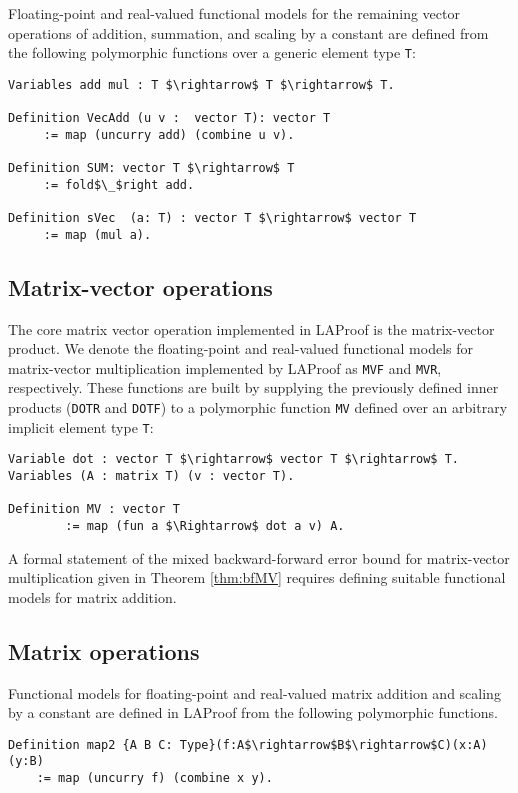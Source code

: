 Floating-point and real-valued functional models for the remaining vector operations of addition,  summation,  and scaling by a constant are defined from the following polymorphic functions over a generic element type \lstinline{T}:
%
\begin{lstlisting}
Variables add mul : T $\rightarrow$ T $\rightarrow$ T. 

Definition VecAdd (u v :  vector T): vector T
     := map (uncurry add) (combine u v).

Definition SUM: vector T $\rightarrow$ T
     := fold$\_$right add. 
  
Definition sVec  (a: T) : vector T $\rightarrow$ vector T
     := map (mul a).
 \end{lstlisting} \vspace{-1em}
%

\subsection{Matrix-vector operations}
The core matrix vector operation implemented in LAProof is the matrix-vector product. We denote the floating-point and real-valued functional models for matrix-vector  multiplication implemented by LAProof as  \lstinline{MVF} and  \lstinline{MVR}, respectively. These functions are built by supplying the previously defined inner products (\lstinline{DOTR} and \lstinline{DOTF}) to a polymorphic function \lstinline{MV} defined over an arbitrary implicit element type \lstinline{T}:
\begin{lstlisting}
Variable dot : vector T $\rightarrow$ vector T $\rightarrow$ T. 
Variables (A : matrix T) (v : vector T).

Definition MV : vector T
        := map (fun a $\Rightarrow$ dot a v) A.
 \end{lstlisting}

A formal statement of the mixed backward-forward error bound for matrix-vector multiplication given in Theorem \ref{thm:bfMV} requires defining suitable functional models for matrix addition. 

\subsection{Matrix operations}
Functional models for floating-point and real-valued matrix addition and scaling by a constant are defined in LAProof from the following polymorphic functions. 
\begin{lstlisting}
Definition map2 {A B C: Type}(f:A$\rightarrow$B$\rightarrow$C)(x:A)(y:B)
    := map (uncurry f) (combine x y).
 \end{lstlisting}

